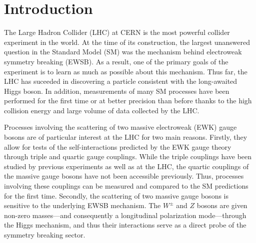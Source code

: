 \chapter[Introduction][Introduction]{Introduction}
The Large Hadron Collider (LHC) at CERN is the most powerful collider experiment in the world.
At the time of its construction, the largest unanswered question in the Standard Model (SM) was the mechanism behind electroweak symmetry breaking (EWSB).
As a result, one of the primary goals of the experiment is to learn as much as possible about this mechanism.
Thus far, the LHC has suceeded in discovering a particle consistent with the long-awaited Higgs boson. %
In addition, measurements of many SM processes have been performed for the first time or at better precision than before thanks to the high collision energy and large volume of data collected by the LHC.

Processes involving the scattering of two massive electroweak (EWK) gauge bosons are of particular interest at the LHC for two main reasons.
Firstly, they allow for tests of the self-interactions predicted by the EWK gauge theory through triple and quartic gauge couplings.
While the triple couplings have been studied by previous experiments as well as at the LHC, the quartic couplings of the massive gauge bosons have not been accessible previously.
Thus, processes involving these couplings can be measured and compared to the SM predictions for the first time.
Secondly, the scattering of two massive gauge bosons is sensitive to the underlying EWSB mechanism.
The $W^{\pm}$ and $Z$ bosons are given non-zero masses---and consequently a longitudinal polarization mode---through the Higgs mechanism, and thus their interactions serve as a direct probe of the symmetry breaking sector.

